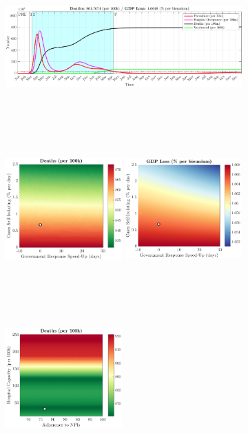 \documentclass[paper=a4, fontsize=11pt]{scrartcl}
\numberwithin{figure}{section}
\numberwithin{table}{section}
\begin{document}
\begin{figure}[H]
\centering
    \begin{subfigure}[b]{\textwidth}
     	\includegraphics[width=\textwidth,height=5.5cm]{Counterfactuals/UK_cv19}
    \end{subfigure}
    \begin{subfigure}[b]{\textwidth}
      	\includegraphics[width=0.49\textwidth,height=6cm]{UK/COVID/ero_d}
	\hspace{0.05cm}
    	\includegraphics[width=0.49\textwidth,height=6cm]{UK/COVID/ero_g}
    \end{subfigure}
    \begin{subfigure}[b]{\textwidth}
      	\includegraphics[width=0.49\textwidth,height=6cm]{UK/COVID/npl_d}

\end{subfigure}
\end{figure}
\end{document}
